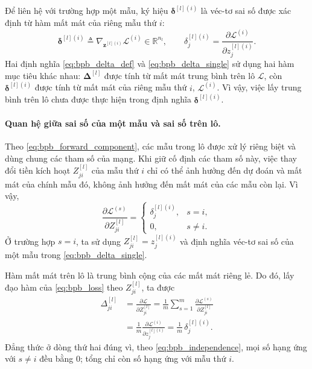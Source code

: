 Để liên hệ với trường hợp một mẫu, ký hiệu $\boldsymbol{\delta}^{[l](i)}$ là véc-tơ sai số được xác định từ hàm mất mát của riêng mẫu thứ $i$:
\begin{equation}
\label{eq:bpb_delta_single}
\boldsymbol{\delta}^{[l](i)}
\triangleq\nabla_{\mathbf{z}^{[l](i)}}\mathcal{L}^{(i)}
\in\mathbb{R}^{n_l},
\qquad
\delta_j^{[l](i)}
=\frac{\partial\mathcal{L}^{(i)}}{\partial z_j^{[l](i)}}.
\end{equation}
Hai định nghĩa \eqref{eq:bpb_delta_def} và
\eqref{eq:bpb_delta_single} sử dụng hai hàm mục tiêu khác nhau:
$\boldsymbol{\Delta}^{[l]}$ được tính từ mất mát trung bình trên lô $\mathcal{L}$, còn $\boldsymbol{\delta}^{[l](i)}$ được tính từ mất mát của riêng mẫu thứ $i$, $\mathcal{L}^{(i)}$. Vì vậy, việc lấy trung bình trên lô chưa được thực hiện trong định nghĩa $\boldsymbol{\delta}^{[l](i)}$.
\paragraph{Quan hệ giữa sai số của một mẫu và sai số trên lô.}
Theo \eqref{eq:bpb_forward_component}, các mẫu trong lô được
xử lý riêng biệt và dùng chung các tham số của mạng. Khi giữ cố định các tham số này, việc thay đổi tiền kích hoạt $Z_{ji}^{[l]}$ của mẫu thứ $i$ chỉ có thể ảnh hưởng đến dự đoán và mất mát của chính mẫu đó, không ảnh hưởng đến mất mát của các mẫu còn lại. Vì vậy,
\begin{equation}
\label{eq:bpb_independence}
\frac{\partial\mathcal{L}^{(s)}}{\partial Z_{ji}^{[l]}}
=\begin{cases}
\delta_j^{[l](i)}, & s=i,\\[2pt]
0, & s\neq i.
\end{cases}
\end{equation}
Ở trường hợp $s=i$, ta sử dụng
$Z_{ji}^{[l]}=z_j^{[l](i)}$ và định nghĩa véc-tơ sai số của
một mẫu trong \eqref{eq:bpb_delta_single}.

Hàm mất mát trên lô là trung bình cộng của các mất mát riêng lẻ.
Do đó, lấy đạo hàm của \eqref{eq:bpb_loss} theo $Z_{ji}^{[l]}$,
ta được
\begin{equation}
\label{eq:bpb_delta_component_scale}
\begin{aligned}
\Delta_{ji}^{[l]}
&=\frac{\partial\mathcal{L}}{\partial Z_{ji}^{[l]}}
=\frac{1}{m}\sum_{s=1}^{m}
\frac{\partial\mathcal{L}^{(s)}}{\partial Z_{ji}^{[l]}}\\
&=\frac{1}{m}
\frac{\partial\mathcal{L}^{(i)}}{\partial z_j^{[l](i)}}
=\frac{1}{m}\,\delta_j^{[l](i)}.
\end{aligned}
\end{equation}
Đẳng thức ở dòng thứ hai đúng vì, theo
\eqref{eq:bpb_independence}, mọi số hạng ứng với $s\neq i$
đều bằng $0$; tổng chỉ còn số hạng ứng với mẫu thứ $i$.

